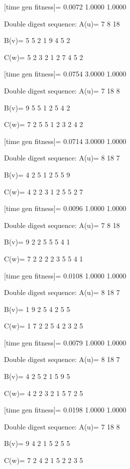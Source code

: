 [time gen fitness]=
    0.0072    1.0000    1.0000

Double digest sequence:
A(u)=
     7     8    18

B(v)=
     5     5     2     1     9     4     5     2

C(w)=
     5     2     3     2     1     2     7     4     5     2

[time gen fitness]=
    0.0754    3.0000    1.0000

Double digest sequence:
A(u)=
     7    18     8

B(v)=
     9     5     5     1     2     5     4     2

C(w)=
     7     2     5     5     1     2     3     2     4     2

[time gen fitness]=
    0.0714    3.0000    1.0000

Double digest sequence:
A(u)=
     8    18     7

B(v)=
     4     2     5     1     2     5     5     9

C(w)=
     4     2     2     3     1     2     5     5     2     7

[time gen fitness]=
    0.0096    1.0000    1.0000

Double digest sequence:
A(u)=
     7     8    18

B(v)=
     9     2     2     5     5     5     4     1

C(w)=
     7     2     2     2     2     3     5     5     4     1

[time gen fitness]=
    0.0108    1.0000    1.0000

Double digest sequence:
A(u)=
     8    18     7

B(v)=
     1     9     2     5     4     2     5     5

C(w)=
     1     7     2     2     5     4     2     3     2     5

[time gen fitness]=
    0.0079    1.0000    1.0000

Double digest sequence:
A(u)=
     8    18     7

B(v)=
     4     2     5     2     1     5     9     5

C(w)=
     4     2     2     3     2     1     5     7     2     5

[time gen fitness]=
    0.0198    1.0000    1.0000

Double digest sequence:
A(u)=
     7    18     8

B(v)=
     9     4     2     1     5     2     5     5

C(w)=
     7     2     4     2     1     5     2     2     3     5

